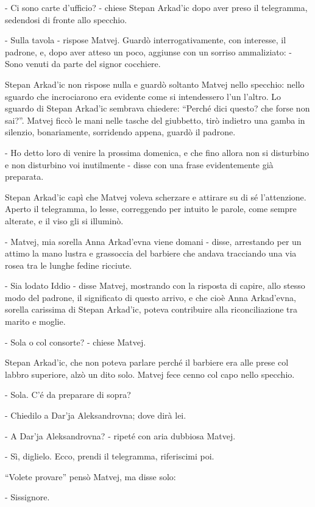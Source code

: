 - Ci sono carte d'ufficio? - chiese Stepan Arkad'ic dopo aver preso il telegramma, sedendosi di fronte allo specchio. 

- Sulla tavola - rispose Matvej. Guardò interrogativamente, con interesse, il padrone, e, dopo aver atteso un poco, aggiunse con un sorriso ammaliziato: - Sono venuti da parte del signor cocchiere. 

Stepan Arkad'ic non rispose nulla e guardò soltanto Matvej nello specchio: nello sguardo che incrociarono era evidente come si intendessero l'un l'altro. Lo sguardo di Stepan Arkad'ic sembrava chiedere: ``Perché dici questo? che forse non sai?''. Matvej ficcò le mani nelle tasche del giubbetto, tirò indietro una gamba in silenzio, bonariamente, sorridendo appena, guardò il padrone. 

- Ho detto loro di venire la prossima domenica, e che fino allora non si disturbino e non disturbino voi inutilmente - disse con una frase evidentemente già preparata. 

Stepan Arkad'ic capì che Matvej voleva scherzare e attirare su di sé l'attenzione. Aperto il telegramma, lo lesse, correggendo per intuito le parole, come sempre alterate, e il viso gli si illuminò. 

- Matvej, mia sorella Anna Arkad'evna viene domani - disse, arrestando per un attimo la mano lustra e grassoccia del barbiere che andava tracciando una via rosea tra le lunghe fedine ricciute. 

- Sia lodato Iddio - disse Matvej, mostrando con la risposta di capire, allo stesso modo del padrone, il significato di questo arrivo, e che cioè Anna Arkad'evna, sorella carissima di Stepan Arkad'ic, poteva contribuire alla riconciliazione tra marito e moglie. 

- Sola o col consorte? - chiese Matvej. 

Stepan Arkad'ic, che non poteva parlare perché il barbiere era alle prese col labbro superiore, alzò un dito solo. Matvej fece cenno col capo nello specchio. 

- Sola. C'é da preparare di sopra? 

- Chiedilo a Dar'ja Aleksandrovna; dove dirà lei. 

- A Dar'ja Aleksandrovna? - ripeté con aria dubbiosa Matvej. 

- Sì, diglielo. Ecco, prendi il telegramma, riferiscimi poi. 

``Volete provare'' pensò Matvej, ma disse solo: 

- Sissignore. 

